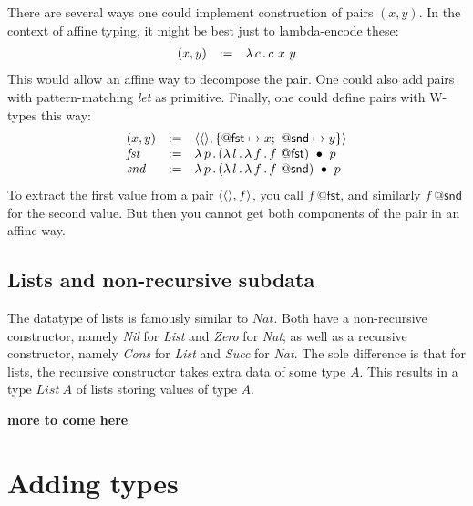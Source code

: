 \documentclass{article}
\begin{document}
There are several ways one could implement construction of pairs $(x,y)$. In the context of affine typing, it might be
best just to lambda-encode these:
\[
\begin{array}{lll}
  (x,y) & := & \lambda\, c\, .\, c\ x\ y
\end{array}
\]
\noindent This would allow an affine way to decompose the pair.  One
could also add pairs with pattern-matching \emph{let} as primitive.
Finally, one could define pairs with W-types this way:
\[
\begin{array}{lll}
  (x,y) & := & \ctor{\wunit}{\{\mathsf{@fst} \mapsto x;\ \mathsf{@snd} \mapsto y\}} \\
  \textit{fst} & := & \lam{p}{\wrec{(\lam{l}{\lam{f}{f\ \mathsf{@fst}}})}{p}} \\
  \textit{snd} & := & \lam{p}{\wrec{(\lam{l}{\lam{f}{f\ \mathsf{@snd}}})}{p}} 
\end{array}
\]
\noindent To extract the first value from a pair $\langle \langle\rangle , f \rangle$,
you call $f\ \mathsf{@fst}$, and similarly $f\ \mathsf{@snd}$ for the
second value.  But then you cannot get both components of the pair
in an affine way.

\subsection{Lists and non-recursive subdata}

The datatype of lists is famously similar to $\textit{Nat}$.  Both
have a non-recursive constructor, namely \textit{Nil} for
\textit{List} and \textit{Zero} for \textit{Nat}; as well as a
recursive constructor, namely \textit{Cons} for \textit{List} and
\textit{Succ} for \textit{Nat}.  The sole difference is that for
lists, the recursive constructor takes extra data of some type $A$.
This results in a type $\textit{List}\ A$ of lists storing values of
type $A$.

\textbf{more to come here}


\section{Adding types}



\end{document}

